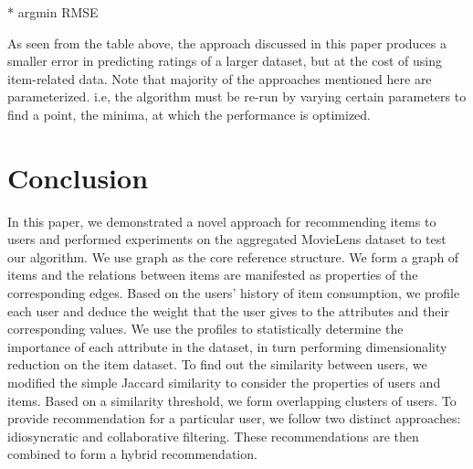 \documentclass{acm_proc_article-sp}
\begin{document}
* argmin RMSE

As seen from the table above, the approach discussed in this paper produces a smaller error in predicting ratings of a larger dataset, but at the cost of using item-related data. Note that majority of the approaches mentioned here are parameterized. i.e, the algorithm must be re-run by varying certain parameters to find a point, the minima, at which the performance is optimized.




% 

\section{Conclusion}
\label{sec:conclusion}
In this paper, we demonstrated a novel approach for recommending items to users and performed experiments on the aggregated MovieLens dataset to test our algorithm. We use graph as the core reference structure. We form a graph of items and the relations between items are manifested as properties of the corresponding edges. Based on the users' history of item consumption, we profile each user and deduce the weight that the user gives to the attributes and their corresponding values. We use the profiles to statistically determine the importance of each attribute in the dataset, in turn performing dimensionality reduction on the item dataset. To find out the similarity between users, we modified the simple Jaccard similarity to consider the properties of users and items. Based on a similarity threshold, we form overlapping clusters of users. To provide recommendation for a particular user, we follow two distinct approaches: idiosyncratic and collaborative filtering. These recommendations are then combined to 
form a hybrid recommendation.
\end{document}
